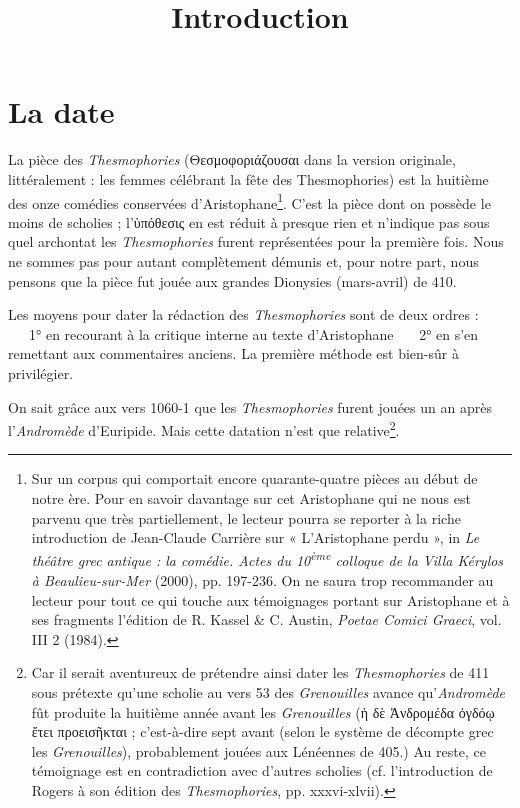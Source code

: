 \documentclass{book}%
\newcommand{\italique}[1]{\textit{#1}}%
\newcommand{\expo}[1]{\textsuperscript{#1}}%
\newcommand{\Partie}[1]{\section*{#1}%
\addcontentsline{toc}{section}{#1}}
\newcommand{\note}[1]{\footnote{#1}}
\begin{document}
 
\renewcommand{\contentsname}{Introduction}
\title{Introduction}
\author{}\date{}
\maketitle
\setcounter{page}{0}


\tableofcontents
\setcounter{page}{1}
\cleardoublepage

\Partie{La date}

La pièce des \italique{Thesmophories} (Θεσμοφοριάζουσαι dans la version originale, littéralement : les femmes célébrant la fête des Thesmophories) est la huitième des onze comédies conservées d’Aristophane\note{Sur un corpus qui comportait encore quarante-quatre pièces au début de notre ère. Pour en savoir davantage sur cet Aristophane qui ne nous est parvenu que très partiellement, le lecteur pourra se reporter à la riche introduction de Jean-Claude Carrière sur « L'Aristophane perdu », in \italique{Le théâtre grec antique : la comédie. Actes du 10\expo{ème} colloque de la Villa Kérylos à Beaulieu-sur-Mer} (2000), pp. 197-236. On ne saura trop recommander au lecteur pour tout ce qui touche aux témoignages portant sur Aristophane et à ses fragments  l'édition de R. Kassel \& C. Austin, \italique{Poetae Comici Graeci}, vol. III 2 (1984).}. 
C'est la pièce dont on possède le moins de scholies ; l'ὑπόθεσις en est réduit à presque rien et n'indique pas sous quel archontat les \italique{Thesmophories} furent représentées pour la première fois. Nous ne sommes pas pour autant complètement démunis et, pour notre part, nous pensons que la pièce fut jouée aux grandes Dionysies (mars-avril) de 410.

Les moyens pour dater la rédaction des \italique{Thesmophories} sont de deux ordres : \ \ \ 1° en recourant à la critique interne au texte d'Aristophane \ \ \ 2° en s'en remettant aux commentaires anciens.
La première méthode est bien-sûr à privilégier.

On sait grâce aux vers 1060-1 que les \italique{Thesmophories} furent jouées un an après l'\italique{Andromède} d'Euripide.
Mais cette datation n'est que relative\note{Car il serait aventureux de prétendre ainsi dater les \italique{Thesmophories} de 411 sous prétexte qu'une scholie au vers 53 des \italique{Grenouilles} avance qu'\italique{Andromède} fût produite la huitième année avant les \italique{Grenouilles} (ἡ δὲ Ἀνδρομέδα ὀγδόῳ ἔτει προεισῆκται ; c'est-à-dire sept avant (selon le système de décompte grec les \italique{Grenouilles}), probablement jouées aux Lénéennes de 405.) Au reste, ce témoignage est en contradiction avec d'autres scholies (cf. l'introduction de Rogers à son édition des \italique{Thesmophories}, pp. xxxvi-xlvii).}.
\end{document}
